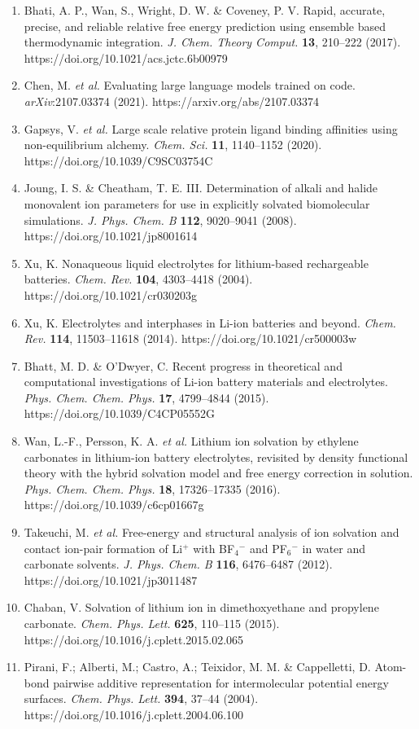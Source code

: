 \documentclass[
  11pt,
]{article}
\begin{document}
\begin{enumerate}
{  Phys. Lett.} \textbf{222}, 529--539 (1994).
  https://doi.org/10.1016/0009-2614(94)00397-1
\item
  Bhati, A. P., Wan, S., Wright, D. W. \& Coveney, P. V. Rapid,
  accurate, precise, and reliable relative free energy prediction using
  ensemble based thermodynamic integration. \emph{J. Chem. Theory
  Comput.} \textbf{13}, 210--222 (2017).
  https://doi.org/10.1021/acs.jctc.6b00979
\item
  Chen, M. \emph{et al.} Evaluating large language models trained on
  code. \emph{arXiv}:2107.03374 (2021). https://arxiv.org/abs/2107.03374
\item
  Gapsys, V. \emph{et al.} Large scale relative protein ligand binding
  affinities using non-equilibrium alchemy. \emph{Chem. Sci.}
  \textbf{11}, 1140--1152 (2020). https://doi.org/10.1039/C9SC03754C
\item
  Joung, I. S. \& Cheatham, T. E. III. Determination of alkali and
  halide monovalent ion parameters for use in explicitly solvated
  biomolecular simulations. \emph{J. Phys. Chem. B} \textbf{112},
  9020--9041 (2008). https://doi.org/10.1021/jp8001614
\item
  Xu, K. Nonaqueous liquid electrolytes for lithium-based rechargeable
  batteries. \emph{Chem. Rev.} \textbf{104}, 4303--4418 (2004).
  https://doi.org/10.1021/cr030203g
\item
  Xu, K. Electrolytes and interphases in Li-ion batteries and beyond.
  \emph{Chem. Rev.} \textbf{114}, 11503--11618 (2014).
  https://doi.org/10.1021/cr500003w
\item
  Bhatt, M. D. \& O'Dwyer, C. Recent progress in theoretical and
  computational investigations of Li-ion battery materials and
  electrolytes. \emph{Phys. Chem. Chem. Phys.} \textbf{17}, 4799--4844
  (2015). https://doi.org/10.1039/C4CP05552G
\item
  Wan, L.-F., Persson, K. A. \emph{et al.} Lithium ion solvation by
  ethylene carbonates in lithium-ion battery electrolytes, revisited by
  density functional theory with the hybrid solvation model and free
  energy correction in solution. \emph{Phys. Chem. Chem. Phys.}
  \textbf{18}, 17326--17335 (2016). https://doi.org/10.1039/c6cp01667g
\item
  Takeuchi, M. \emph{et al.} Free-energy and structural analysis of ion
  solvation and contact ion-pair formation of Li\(^{+}\) with
  BF\(_{4}\)\(^{-}\) and PF\(_{6}\)\(^{-}\) in water and carbonate
  solvents. \emph{J. Phys. Chem. B} \textbf{116}, 6476--6487 (2012).
  https://doi.org/10.1021/jp3011487
\item
  Chaban, V. Solvation of lithium ion in dimethoxyethane and propylene
  carbonate. \emph{Chem. Phys. Lett.} \textbf{625}, 110--115 (2015).
  https://doi.org/10.1016/j.cplett.2015.02.065
\item
  Pirani, F.; Alberti, M.; Castro, A.; Teixidor, M. M. \& Cappelletti,
  D. Atom-bond pairwise additive representation for intermolecular
  potential energy surfaces. \emph{Chem. Phys. Lett.} \textbf{394},
  37--44 (2004). https://doi.org/10.1016/j.cplett.2004.06.100
\end{enumerate}
\end{document}
